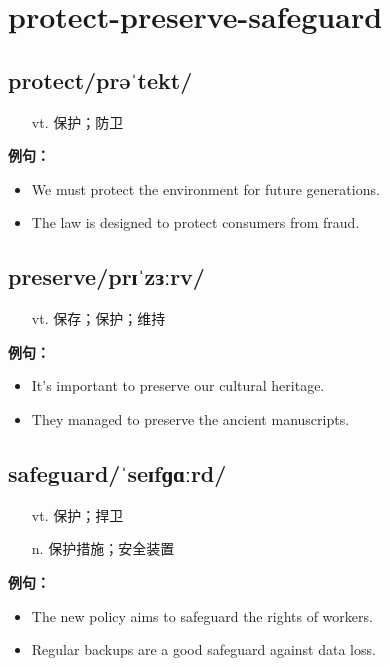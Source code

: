 \documentclass[12pt]{article}
\begin{document}
\section*{protect-preserve-safeguard}
\begin{multicols}{2}
\subsection*{\textbf{protect}\quad/prəˈtekt/}
\begin{itemize}[leftmargin=2em]
\item[vt.] 保护；防卫
\end{itemize}
\textbf{例句：}
\begin{itemize}[leftmargin=2em]
\item We must protect the environment for future generations.
\item The law is designed to protect consumers from fraud.
\end{itemize}
\subsection*{\textbf{preserve}\quad/prɪˈzɜːrv/}
\begin{itemize}[leftmargin=2em]
\item[vt.] 保存；保护；维持
\end{itemize}
\textbf{例句：}
\begin{itemize}[leftmargin=2em]
\item It's important to preserve our cultural heritage.
\item They managed to preserve the ancient manuscripts.
\end{itemize}
\subsection*{\textbf{safeguard}\quad/ˈseɪfɡɑːrd/}
\begin{itemize}[leftmargin=2em]
\item[vt.] 保护；捍卫
\item[n.] 保护措施；安全装置
\end{itemize}
\textbf{例句：}
\begin{itemize}[leftmargin=2em]
\item The new policy aims to safeguard the rights of workers.
\item Regular backups are a good safeguard against data loss.
\end{itemize}
\end{multicols}
\end{document}
